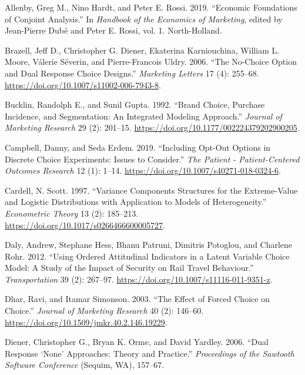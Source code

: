 \documentclass[
  letterpaper,
  DIV=11,
  numbers=noendperiod]{scrartcl}
\newlength{\cslhangindent}
\newenvironment{CSLReferences}[2] %
 {\begin{list}{}{%
  \setlength{\itemindent}{0pt}
  \setlength{\leftmargin}{0pt}
  \setlength{\parsep}{0pt}
  \ifodd #1
   \setlength{\leftmargin}{\cslhangindent}
   \setlength{\itemindent}{-1\cslhangindent}
  \fi
  \setlength{\itemsep}{#2\baselineskip}}}
 {\end{list}}
\theoremstyle{plain}
\theoremstyle{plain}
\theoremstyle{remark}
\begin{document}
\protect{}\label{refs}
\begin{CSLReferences}{1}{1}
Allenby, Greg M., Nino Hardt, and Peter E. Rossi. 2019. {``Economic
Foundations of Conjoint Analysis.''} In \emph{Handbook of the Economics
of Marketing}, edited by Jean-Pierre Dubé and Peter E. Rossi, vol. 1.
North-Holland.

Brazell, Jeff D., Christopher G. Diener, Ekaterina Karniouchina, William
L. Moore, Válerie Séverin, and Pierre-Francois Uldry. 2006. {``The
No-Choice Option and Dual Response Choice Designs.''} \emph{Marketing
Letters} 17 (4): 255--68.
\url{https://doi.org/10.1007/s11002-006-7943-8}.

Bucklin, Randolph E., and Sunil Gupta. 1992. {``Brand Choice, Purchase
Incidence, and Segmentation: An Integrated Modeling Approach.''}
\emph{Journal of Marketing Research} 29 (2): 201--15.
\url{https://doi.org/10.1177/002224379202900205}.

Campbell, Danny, and Seda Erdem. 2019. {``Including Opt-Out Options in
Discrete Choice Experiments: Issues to Consider.''} \emph{The Patient -
Patient-Centered Outcomes Research} 12 (1): 1--14.
\url{https://doi.org/10.1007/s40271-018-0324-6}.

Cardell, N. Scott. 1997. {``Variance Components Structures for the
Extreme-Value and Logistic Distributions with Application to Models of
Heterogeneity.''} \emph{Econometric Theory} 13 (2): 185--213.
\url{https://doi.org/10.1017/s0266466600005727}.

Daly, Andrew, Stephane Hess, Bhanu Patruni, Dimitris Potoglou, and
Charlene Rohr. 2012. {``Using Ordered Attitudinal Indicators in a Latent
Variable Choice Model: A Study of the Impact of Security on Rail Travel
Behaviour.''} \emph{Transportation} 39 (2): 267--97.
\url{https://doi.org/10.1007/s11116-011-9351-z}.

Dhar, Ravi, and Itamar Simonson. 2003. {``The Effect of Forced Choice on
Choice.''} \emph{Journal of Marketing Research} 40 (2): 146--60.
\url{https://doi.org/10.1509/jmkr.40.2.146.19229}.

Diener, Christopher G., Bryan K. Orme, and David Yardley. 2006. {``Dual
Response {`None'} Approaches: Theory and Practice.''} \emph{Proceedings
of the Sawtooth Software Conference} (Sequim, WA), 157--67.


\end{CSLReferences}
\end{document}
